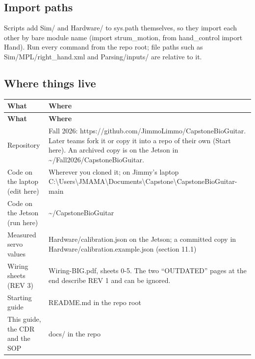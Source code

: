 \documentclass[11pt,letterpaper]{article}
\newcommand{\code}[1]{\textcolor{codeblue}{\ttfamily\smaller\relax #1}}
\begin{document}
\subsection{Import paths}
Scripts add \code{Sim/\allowbreak{}} and \code{Hardware/\allowbreak{}} to \code{sys.path} themselves, so they import each other by bare module name (\code{import strum\_\allowbreak{}motion}, \code{from hand\_\allowbreak{}control import Hand}). Run every command from the repo root; file paths such as \code{Sim/\allowbreak{}MPL/\allowbreak{}right\_\allowbreak{}hand.xml} and \code{Parsing/\allowbreak{}inputs/\allowbreak{}} are relative to it.


\subsection{Where things live}
{\small
\begin{longtable}{|>{\raggedright\arraybackslash}p{}|>{\raggedright\arraybackslash}p{}|}
\hline
\rowcolor{tblhead}\textbf{What} & \textbf{Where} \\ \hline
\endfirsthead
\hline
\rowcolor{tblhead}\textbf{What} & \textbf{Where} \\ \hline
\endhead
Repository & Fall 2026: \code{https:/\allowbreak{}/\allowbreak{}github.com/\allowbreak{}JimmoLimmo/\allowbreak{}CapstoneBioGuitar}. Later teams fork it or copy it into a repo of their own (Start here). An archived copy is on the Jetson in \code{\textasciitilde{}/\allowbreak{}Fall2026/\allowbreak{}CapstoneBioGuitar}. \\ \hline
Code on the laptop (edit here) & Wherever you cloned it; on Jimmy's laptop \code{C:\textbackslash\allowbreak{}Users\textbackslash\allowbreak{}JMAMA\textbackslash\allowbreak{}Documents\textbackslash\allowbreak{}Capstone\textbackslash\allowbreak{}CapstoneBioGuitar-{}\allowbreak{}main} \\ \hline
Code on the Jetson (run here) & \code{\textasciitilde{}/\allowbreak{}CapstoneBioGuitar} \\ \hline
Measured servo values & \code{Hardware/\allowbreak{}calibration.json} on the Jetson; a committed copy in \code{Hardware/\allowbreak{}calibration.example.json} (section 11.1) \\ \hline
Wiring sheets (REV 3) & \code{Wiring-{}\allowbreak{}BIG.pdf}, sheets 0-5. The two ``OUTDATED'' pages at the end describe REV 1 and can be ignored. \\ \hline
Starting guide & \code{README.md} in the repo root \\ \hline
This guide, the CDR and the SOP & \code{docs/\allowbreak{}} in the repo \\ \hline
\end{longtable}}
\end{document}
